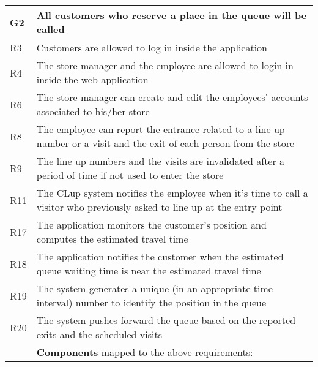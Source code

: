 \begin{center}
    {\renewcommand{\arraystretch}{1.5}
    \begin{longtable}{L{2.5cm}L{12cm}}
        \hline
        \textbf{G2} & \textbf{All customers who reserve a place in the queue will be called} \\
        \hline
         R3 & Customers are allowed to log in inside the application \\
        \hline
         R4 & The store manager and the employee are allowed to login in inside the web application \\
        \hline
         R6 & The store manager can create and edit the employees’ accounts associated to his/her store \\
        \hline
         R8 & The employee can report the entrance related to a line up number or a visit and the exit of each person from the store \\
        \hline
         R9 & The line up numbers and the visits are invalidated after a period of time if not used to enter the store \\
        \hline
         R11 & The CLup system notifies the employee when it’s time to call a visitor who previously asked to line up at the entry point \\
        \hline
         R17 & The application monitors the customer’s position and computes the estimated travel time \\
        \hline
         R18 & The application notifies the customer when the estimated queue waiting time is near the estimated travel time \\
        \hline
         R19 & The system generates a unique (in an appropriate time interval) number to identify the position in the queue \\
        \hline
         R20 & The system pushes forward the queue based on the reported exits and the scheduled visits \\
        \hline
         & \textbf{Components} mapped to the above requirements:


\end{longtable}}
\end{center}
